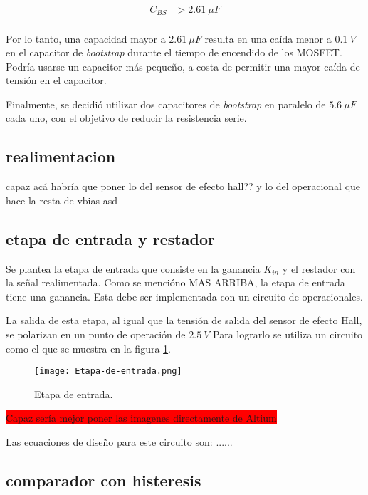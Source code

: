 \begin{equation} 
	\begin{aligned}
		C_{BS} &> 2.61 \:\mu F\\	
	\end{aligned}
\end{equation}


\noindent Por lo tanto, una capacidad mayor a $2.61 \:\mu F$ resulta en una caída menor a $0.1\:V$ en el capacitor de \textsl{bootstrap} durante el tiempo de encendido de los MOSFET. Podría usarse un capacitor más pequeño, a costa de permitir una mayor caída de tensión en el capacitor. 

\noindent Finalmente, se decidió utilizar dos capacitores de \textsl{bootstrap} en paralelo de $5.6 \:\mu F$ cada uno, con el objetivo de reducir la resistencia serie.



\subsection{realimentacion}
capaz acá habría que poner lo del sensor de efecto hall?? y lo del operacional que hace la resta de vbias
asd


\subsection{etapa de entrada y restador}


Se plantea la etapa de entrada que consiste en la ganancia $K_{in}$ y el restador con la señal realimentada. Como se mencióno MAS ARRIBA, la etapa de entrada tiene una ganancia. Esta debe ser implementada con un circuito de operacionales.

La salida de esta etapa, al igual que la tensión de salida del sensor de efecto Hall, se polarizan en un punto de operación de $2.5\:V$ Para lograrlo se utiliza un circuito como el que se muestra en la figura \ref{fig:img_etapa-de-entrada}.


\begin{figure}[H]
	\centering
	\texttt{[image: Etapa-de-entrada.png]}
	\caption{Etapa de entrada.}
	\label{fig:img_etapa-de-entrada}
\end{figure}
\colorbox{red}{Capaz sería mejor poner las imagenes directamente de Altium}

Las ecuaciones de diseño para este circuito son: ......


\subsection{comparador con histeresis}

